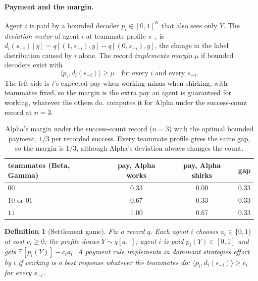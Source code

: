 \documentclass[sigconf,anonymous,acmthm=false]{aamas}
\theoremstyle{acmplain}
\theoremstyle{acmdefinition}
\newtheorem{definition}{Definition}
\newcommand{\E}{\mathbb{E}}
\newcommand{\cube}{\{0,1\}}
\newcommand{\A}{\textsf{Alpha}}
\newcommand{\B}{\textsf{Beta}}
\newcommand{\G}{\textsf{Gamma}}
\begin{document}
\paragraph{Payment and the margin.} Agent $i$ is paid by a bounded decoder $p_i\in[0,1]^K$
that also sees only $Y$. The \emph{deviation vector} of agent $i$ at teammate profile
$s_{-i}$ is $d_i(s_{-i})[y]=q[(1,s_{-i}),y]-q[(0,s_{-i}),y]$, the change in the label
distribution caused by $i$ alone. The record \emph{implements margin} $\mu$ if bounded
decoders exist with
\begin{equation}\label{eq:M}\tag{M}
\langle p_i,d_i(s_{-i})\rangle\ge\mu\quad\text{for every } i \text{ and every } s_{-i}.
\end{equation}
The left side is $i$'s expected pay when working minus when shirking, with teammates fixed,
so the margin is the extra pay an agent is guaranteed for working, whatever the others do.
 computes it for \A{} under the success-count record at $n=3$.

\begin{table}[t]
\caption{\A's margin under the success-count record ($n=3$) with the optimal bounded
payment, $1/3$ per recorded success. Every teammate profile gives the same gap, so the margin
is $1/3$, although \A's deviation always changes the count.}
\label{tab:alpha}
\footnotesize
\begin{tabular}{@{}lccc@{}}
\toprule
teammates (\B, \G) & pay, \A{} works & pay, \A{} shirks & gap\\
\midrule
$00$ & 0.33 & 0.00 & 0.33\\
$10$ or $01$ & 0.67 & 0.33 & 0.33\\
$11$ & 1.00 & 0.67 & 0.33\\
\bottomrule
\end{tabular}
\end{table}

\begin{definition}[Settlement game]\label{def:game}
Fix a record $q$. Each agent $i$ chooses $a_i\in\cube$ at cost $c_i\ge0$; the profile draws
$Y\sim q[a,\cdot]$; agent $i$ is paid $p_i(Y)\in[0,1]$ and gets $\E[p_i(Y)]-c_ia_i$. A payment
rule \emph{implements in dominant strategies} effort by $i$ if working is a best response whatever the
teammates do: $\langle p_i,d_i(s_{-i})\rangle\ge c_i$ for every $s_{-i}$.
\end{definition}
\end{document}
